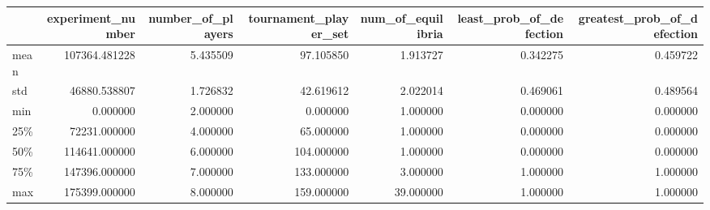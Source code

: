 \begin{tabular}{lrrrrrr}
\toprule
{} &  experiment\_number &  number\_of\_players &  tournament\_player\_set &  num\_of\_equilibria &  least\_prob\_of\_defection &  greatest\_prob\_of\_defection \\
\midrule
mean &      107364.481228 &           5.435509 &              97.105850 &           1.913727 &                 0.342275 &                    0.459722 \\
std  &       46880.538807 &           1.726832 &              42.619612 &           2.022014 &                 0.469061 &                    0.489564 \\
min  &           0.000000 &           2.000000 &               0.000000 &           1.000000 &                 0.000000 &                    0.000000 \\
25\%  &       72231.000000 &           4.000000 &              65.000000 &           1.000000 &                 0.000000 &                    0.000000 \\
50\%  &      114641.000000 &           6.000000 &             104.000000 &           1.000000 &                 0.000000 &                    0.000000 \\
75\%  &      147396.000000 &           7.000000 &             133.000000 &           3.000000 &                 1.000000 &                    1.000000 \\
max  &      175399.000000 &           8.000000 &             159.000000 &          39.000000 &                 1.000000 &                    1.000000 \\
\bottomrule
\end{tabular}


